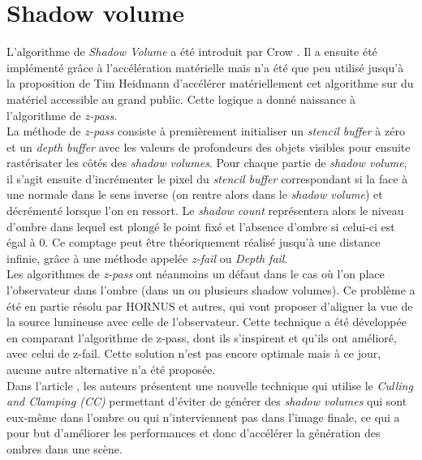 \documentclass[a4paper,10pt]{report}
\begin{document}
\section{Shadow volume}


L'algorithme de \textit{Shadow Volume} a été introduit par Crow \cite{crow1977shadow}. Il a ensuite été implémenté grâce à l'accélération  matérielle\cite{fuchs1986fast} mais n'a été que peu utilisé jusqu'à la proposition de Tim Heidmann d'accélérer matériellement cet algorithme sur du matériel accessible au grand public. Cette logique a donné naissance à l'algorithme de \textit{z-pass}\cite{heidmann1991real}. 
\\

La méthode de \textit{z-pass} consiste à premièrement initialiser un \textit{stencil buffer} à zéro et un \textit{depth buffer} avec les valeurs de profondeurs des objets visibles pour ensuite rastérisater les côtés des \textit{shadow volumes}. Pour chaque partie de \textit{shadow volume}, il s'agit ensuite d'incrémenter le pixel du \textit{stencil buffer} correspondant si la face à une normale dans le sens inverse (on rentre alors dans le \textit{shadow volume}) et décrémenté lorsque l'on en ressort. Le \textit{shadow count} représentera alors le niveau d'ombre dans lequel est plongé le point fixé et l'absence d'ombre si celui-ci est égal à 0.\cite{surveyofshadowalgorithms} Ce comptage peut être théoriquement réalisé jusqu'à une distance infinie, grâce à une méthode appelée \textit{z-fail} ou \textit{Depth fail}\cite{bilodeau1999real, carmack2000z}.
\\

Les algorithmes de \textit{z-pass} ont néanmoins un défaut dans le cas où l'on place l'observateur dans l'ombre (dans un ou plusieurs shadow volumes). Ce problème a été en partie résolu par HORNUS et autres\cite{hornus2005zp+}, qui vont proposer d'aligner la vue de la source lumineuse avec celle de l'observateur. Cette technique a été développée en comparant l'algorithme de z-pass, dont ils s'inspirent et qu'ils ont amélioré, avec celui de z-fail. Cette solution n'est pas encore optimale mais à ce jour, aucune autre alternative n'a été proposée.
\\

Dans l'article \cite{lloyd2004cc}, les auteurs présentent une nouvelle technique qui utilise le \textit{Culling and Clamping (CC)} permettant d'éviter de générer des \textit{shadow volumes} qui sont eux-même dans l'ombre ou qui n'interviennent pas dans l'image finale, ce qui a pour but d'améliorer les performances et donc d'accélérer la génération des ombres dans une scène.
\\
\end{document}
